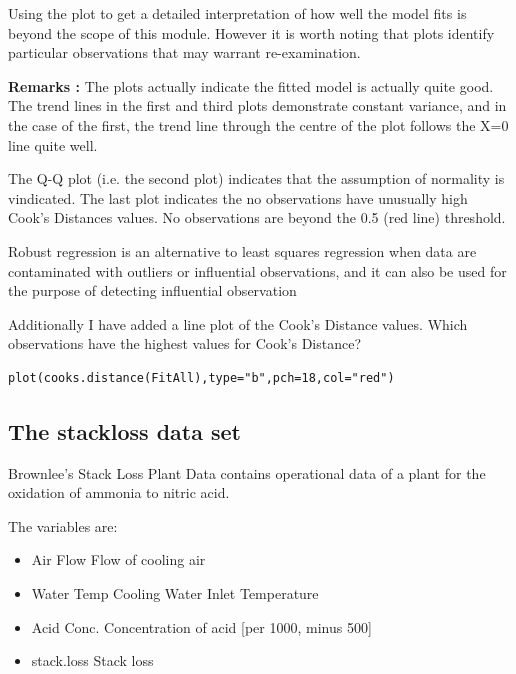 \documentclass[12pt, a4paper]{article}
\theoremstyle{plain}
\theoremstyle{definition}
\theoremstyle{remark}
\begin{document}
Using the plot to get a detailed interpretation of how well the model fits is beyond the scope of this module. However it is worth noting that plots identify particular observations that may warrant re-examination. 

\textbf{Remarks :} 
The plots actually indicate the fitted model is actually quite good. The trend lines in the first and third plots demonstrate constant variance, and in the case of the first, the trend line through the centre of the plot  follows the X=0 line quite well.

The Q-Q plot (i.e. the second plot) indicates that the assumption of normality is vindicated.
The last plot indicates the no observations have unusually high Cook’s Distances values.  No observations are beyond the 0.5 (red line) threshold.

Robust regression is an alternative to least squares regression when data are contaminated with outliers or influential observations, and it can also be used for the purpose of detecting influential observation


Additionally I have added a line plot of the Cook’s Distance values. Which observations have the highest values for Cook’s Distance?

\begin{framed}
\begin{verbatim}
plot(cooks.distance(FitAll),type="b",pch=18,col="red")
\end{verbatim}
\end{framed}





\subsection{The stackloss data set}
Brownlee's Stack Loss Plant Data contains operational data of a plant for the oxidation of ammonia to nitric acid.

The variables are: 
\begin{itemize}
\item	Air Flow	 Flow of cooling air
\item	Water Temp	 Cooling Water Inlet Temperature
\item	Acid Conc.	 Concentration of acid [per 1000, minus 500]
\item	stack.loss	 Stack loss
\end{itemize}
\end{document}
